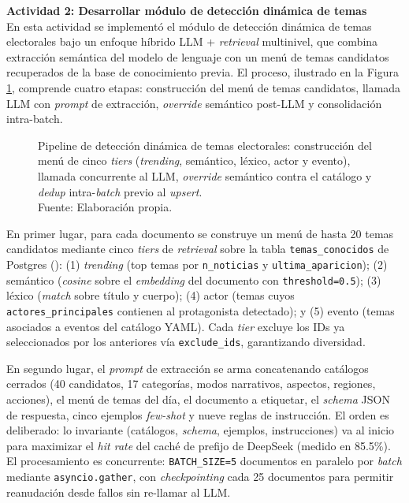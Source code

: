 \textbf{Actividad 2: Desarrollar módulo de detección dinámica de temas}
\\
En esta actividad se implementó el módulo de detección dinámica de temas
electorales bajo un enfoque híbrido LLM + \textit{retrieval} multinivel, que
combina extracción semántica del modelo de lenguaje con un menú de temas
candidatos recuperados de la base de conocimiento previa. El proceso, ilustrado
en la Figura \ref{5:fig18}, comprende cuatro etapas: construcción del menú de
temas candidatos, llamada LLM con \textit{prompt} de extracción, \textit{override}
semántico post-LLM y consolidación intra-batch.

\begin{figure}[!ht]
    \begin{center}
        \resizebox{0.85\textwidth}{!}{}
        \caption[Pipeline de detección dinámica de temas con LLM y retrieval multinivel]{Pipeline de detección dinámica de temas electorales: construcción del menú de cinco \textit{tiers} (\textit{trending}, semántico, léxico, actor y evento), llamada concurrente al LLM, \textit{override} semántico contra el catálogo y \textit{dedup} intra-\textit{batch} previo al \textit{upsert}.\\
            Fuente: Elaboración propia.}
        \label{5:fig18}
    \end{center}
\end{figure}

En primer lugar, para cada documento se construye un menú de hasta 20 temas
candidatos mediante cinco \textit{tiers} de \textit{retrieval} sobre la tabla
\texttt{temas\_conocidos} de Postgres
(): (1) \textit{trending} (top
temas por \texttt{n\_noticias} y \texttt{ultima\_aparicion}); (2) semántico
(\textit{cosine} sobre el \textit{embedding} del documento con \texttt{threshold=0.5});
(3) léxico (\textit{match} sobre título y cuerpo); (4) actor (temas cuyos
\texttt{actores\_principales} contienen al protagonista detectado); y (5) evento
(temas asociados a eventos del catálogo YAML). Cada \textit{tier} excluye los IDs
ya seleccionados por los anteriores vía \texttt{exclude\_ids}, garantizando
diversidad.

En segundo lugar, el \textit{prompt} de extracción se arma concatenando catálogos
cerrados (40 candidatos, 17 categorías, modos narrativos, aspectos, regiones,
acciones), el menú de temas del día, el documento a etiquetar, el \textit{schema}
JSON de respuesta, cinco ejemplos \textit{few-shot} y nueve reglas de
instrucción. El orden es deliberado: lo invariante (catálogos, \textit{schema},
ejemplos, instrucciones) va al inicio para maximizar el \textit{hit rate} del
caché de prefijo de DeepSeek (medido en 85.5\%). El procesamiento es concurrente:
\texttt{BATCH\_SIZE=5} documentos en paralelo por \textit{batch} mediante
\texttt{asyncio.gather}, con \textit{checkpointing} cada 25 documentos para
permitir reanudación desde fallos sin re-llamar al LLM.

